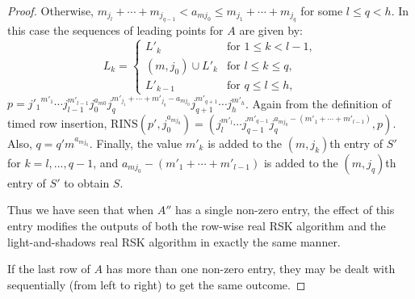 \documentclass[10pt]{amsproc}
\theoremstyle{definition}
\theoremstyle{remark}
\newcommand{\rowins}{\mathrm{RINS}}
\begin{document}
\begin{proof}
  Otherwise, $m_{j_l}+\dotsb+m_{j_{q-1}}<a_{mj_0}\leq m_{j_1}+\dotsb+m_{j_q}$ for some $l\leq q<h$.
  In this case the sequences of leading points for $A$ are given by:
  \begin{displaymath}
    L_k =
    \begin{cases}
      L'_k & \text{for } 1\leq k<l-1,\\
      (m,j_0)\cup L'_k & \text{for } l\leq k\leq q,\\
      L'_{k-1} & \text{for } q\leq l\leq h,
    \end{cases}
  \end{displaymath}
  $p={j'_1}^{m'_1}\dotsb j_{l-1}^{m'_{l-1}}j_0^{a_{m0}}j_q^{m'_{j_1}+\dotsb + m'_{j_q}-a_{mj_0}}j_{q+1}^{m'_{q+1}}\dotsb j_h^{m'_h}$.
  Again from the definition of timed row insertion, $\rowins(p',j_0^{a_{mj_0}}) = (j_l^{m'_l}\dotsb j_{q-1}^{m'_{q-1}}j_q^{a_{mj_0}-(m'_1+\dotsb+m'_{l-1})}, p)$.
  Also, $q=q'm^{a_{mj_0}}$.
  Finally, the value $m'_k$ is added to the $(m,j_k)$th entry of $S'$ for $k=l,\dotsc,q-1$, and $a_{mj_0}-(m'_1+\dotsb+m'_{l-1})$ is added to the $(m,j_q)$th entry of $S'$ to obtain $S$.

  Thus we have seen that when $A''$ has a single non-zero entry, the effect of this entry modifies the outputs of both the row-wise real RSK algorithm and the light-and-shadows real RSK algorithm in exactly the same manner.

  If the last row of $A$ has more than one non-zero entry, they may be dealt with sequentially (from left to right) to get the same outcome.
\end{proof}
\end{document}
